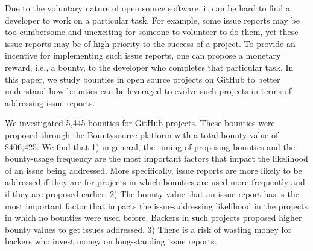 Due to the voluntary nature of open source software, it can be hard to find a developer to work on a particular task. For example, some issue reports may be too cumbersome and unexciting for someone to volunteer to do them, yet these issue reports may be of high priority to the success of a project. To provide an incentive for implementing such issue reports, one can propose a monetary reward, i.e., a bounty, to the developer who completes that particular task.
In this paper, we study bounties in open source projects on GitHub to better understand how bounties can be leveraged to evolve such projects in terms of addressing issue reports.

We investigated 5,445 bounties for GitHub projects. These bounties were proposed through the Bountysource platform with a total bounty value of \$406,425.
We find that 1) in general, the timing of proposing bounties and the bounty-usage frequency are the most important factors that impact the likelihood of an issue being addressed. More specifically, issue reports are more likely to be addressed if they are for projects in which bounties are used more frequently and if they are proposed earlier. 2) The bounty value that an issue report has is the most important factor that impacts the issue-addressing likelihood in the projects in which no bounties were used before. Backers in such projects proposed higher bounty values to get issues addressed. 3) There is a risk of wasting money for backers who invest money on long-standing issue reports. 
